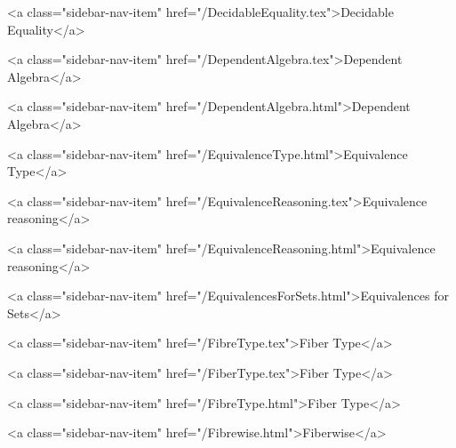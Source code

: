       
    
      
        
          <a class="sidebar-nav-item" href="/DecidableEquality.tex">Decidable Equality</a>
        
      
    
      
        
          <a class="sidebar-nav-item" href="/DependentAlgebra.tex">Dependent Algebra</a>
        
      
    
      
        
          <a class="sidebar-nav-item" href="/DependentAlgebra.html">Dependent Algebra</a>
        
      
    
      
        
          <a class="sidebar-nav-item" href="/EquivalenceType.html">Equivalence Type</a>
        
      
    
      
        
          <a class="sidebar-nav-item" href="/EquivalenceReasoning.tex">Equivalence reasoning</a>
        
      
    
      
        
          <a class="sidebar-nav-item" href="/EquivalenceReasoning.html">Equivalence reasoning</a>
        
      
    
      
        
          <a class="sidebar-nav-item" href="/EquivalencesForSets.html">Equivalences for Sets</a>
        
      
    
      
        
          <a class="sidebar-nav-item" href="/FibreType.tex">Fiber Type</a>
        
      
    
      
        
          <a class="sidebar-nav-item" href="/FiberType.tex">Fiber Type</a>
        
      
    
      
        
          <a class="sidebar-nav-item" href="/FibreType.html">Fiber Type</a>
        
      
    
      
        
          <a class="sidebar-nav-item" href="/Fibrewise.html">Fiberwise</a>
        
